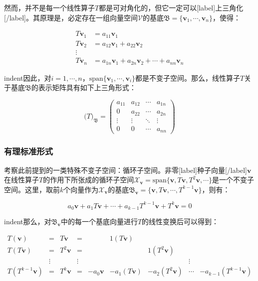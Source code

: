 \documentclass[UTF8,nofonts]{ctexart}
\begin{document}
然而，并不是每一个线性算子$T$都是可对角化的，但它一定可以[label]上三角化[/label]。其原理是，必定存在一组向量空间$\mathcal{V}$的基底$\mathfrak{B}=\{\boldsymbol{v}_1,\cdots,\boldsymbol{v}_n\}$，使得：

\begin{align*}
T\boldsymbol{v}_1 &= a_{11}\boldsymbol{v}_1 \\
T\boldsymbol{v}_2 &= a_{12}\boldsymbol{v}_1+a_{22}\boldsymbol{v}_2 \\
\vdots& \\
T\boldsymbol{v}_n &= a_{1n}\boldsymbol{v}_1+a_{2n}\boldsymbol{v}_2+\cdots+a_{nn}\boldsymbol{v}_n
\end{align*}

indent因此，对$i=1,\cdots,n$，$\text{span}\{\boldsymbol{v}_1,\cdots,\boldsymbol{v}_i\}$都是不变子空间。那么，线性算子$T$关于基底$\mathfrak{B}$的表示矩阵具有如下上三角形式：

\[
\big(T\big)_{\mathfrak{B}}=
\begin{pmatrix}
a_{11} & a_{12} & \cdots & a_{1n} \\
0 & a_{22} & \cdots & a_{2n} \\
\vdots & \vdots & \ddots & \vdots \\
0 & 0 & \cdots & a_{nn}
\end{pmatrix}
\]

\subsubsection*{有理标准形式}

考察此前提到的一类特殊不变子空间：循环子空间。非零[label]种子向量[/label]$\boldsymbol{v}$在线性算子$T$的作用下所张成的循环子空间$\mathcal{X}_{\boldsymbol{v}}=\text{span}\{\boldsymbol{v},T\boldsymbol{v},T^2\boldsymbol{v},\cdots\}$是一个不变子空间。这里，取前$k$个向量作为$\mathcal{X}_{\boldsymbol{v}}$的基底$\mathfrak{B}_{\boldsymbol{v}}=\{\boldsymbol{v},T\boldsymbol{v},\cdots,T^{k-1}\boldsymbol{v}\}$，则有：

\[
a_0\boldsymbol{v}+a_1T\boldsymbol{v}+\cdots+a_{k-1}T^{k-1}\boldsymbol{v}+T^k\boldsymbol{v}=0
\]

indent那么，对$\mathfrak{B}_{\boldsymbol{v}}$中的每一个基底向量进行$T$的线性变换后可以得到：

\[
\begin{array}{lcrcrrrrr}
T(\boldsymbol{v}) & = & T\boldsymbol{v} & = & & 1(T\boldsymbol{v}) & & &\\
T(T\boldsymbol{v}) & = & T^2\boldsymbol{v} & = & & & 1(T^2\boldsymbol{v}) & &\\
& \vdots & & \vdots & & & & \vdots & \\
T(T^{k-1}\boldsymbol{v}) & = & T^k\boldsymbol{v} & = & -a_0\boldsymbol{v} & -a_1(T\boldsymbol{v}) & -a_2(T^2\boldsymbol{v}) & \cdots & -a_{k-1}(T^{k-1}\boldsymbol{v})
\end{array}
\]
\end{document}
